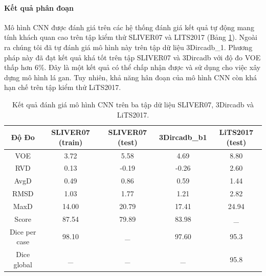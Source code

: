 \paragraph{Kết quả phân đoạn}
Mô hình CNN được đánh giá trên các hệ thống đánh giá kết quả tự động mang tính khách quan cao trên tập kiểm thử SLIVER07 và LITS2017 (Bảng \ref{tab:CNN-SLIVER07_Test}). Ngoài ra chúng tôi đã tự đánh giá mô hình này trên tập dữ liệu 3Dircadb\_1. Phương pháp này đã đạt kết quả khá tốt trên tập SLIVER07 và 3Dircadb với độ đo VOE thấp hơn 6\%. Đây là một kết quả có thể chấp nhận được và sử dụng cho việc xây dựng mô hình lá gan. Tuy nhiên, khả năng hân đoạn của mô hình CNN còn khá hạn chế trên tập kiểm thử LiTS2017.
\begin{table}[]
\begin{tabular}{|c|c|c|c|c|}
\hline
\textbf{Độ Đo} & \textbf{SLIVER07 (train)} & \textbf{SLIVER07 (test)} & \textbf{3Dircadb\_b1} & \textbf{LiTS2017 (test)} \\ \hline
VOE            & 3.72                      & 5.58                     & 4.69                  & 8.80                     \\ \hline
RVD            & 0.13                      & -0.19                    & -0.26                 & 2.60                     \\ \hline
AvgD           & 0.49                      & 0.86                     & 0.59                  & 1.44                     \\ \hline
RMSD           & 1.03                      & 1.77                     & 1.21                  & 2.82                     \\ \hline
MaxD           & 14.00                     & 20.79                    & 17.41                 & 24.94                    \\ \hline
Score          & 87.54                     & 79.89                    & 83.98                 & \_                       \\ \hline
Dice per case  & 98.10                     & \_                       & 97.60                 & 95.3                     \\ \hline
Dice global    & \_                        & \_                       & \_                    & 95.8                     \\ \hline
\end{tabular}
\caption{\label{tab:CNN-SLIVER07_Test}Kết quả đánh giá mô hình CNN trên ba tập dữ liệu SLIVER07, 3Dircadb và LiTS2017.}
\end{table}

